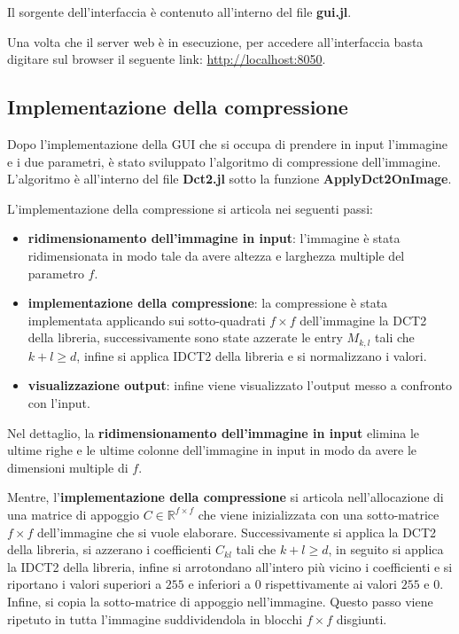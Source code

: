 Il sorgente dell'interfaccia è contenuto all'interno del file \textbf{gui.jl}.

Una volta che il server web è in esecuzione, per accedere all'interfaccia basta
digitare sul browser il seguente link: \href{http://localhost:8050}{http://localhost:8050}.

\subsection{Implementazione della compressione}
Dopo l'implementazione della GUI che si occupa di prendere in input l'immagine e
i due parametri, è stato sviluppato l'algoritmo di compressione dell'immagine.
L'algoritmo è all'interno del file \textbf{Dct2.jl} sotto la funzione \textbf{ApplyDct2OnImage}.

L'implementazione della compressione si articola nei seguenti passi:
\begin{itemize}
    \item \textbf{ridimensionamento dell'immagine in input}: l'immagine è stata
          ridimensionata in modo tale da avere altezza e larghezza multiple del
          parametro $f$.
    \item \textbf{implementazione della compressione}: la compressione è stata
          implementata applicando sui sotto-quadrati $f\times f$ dell'immagine
          la DCT2 della libreria, successivamente sono state azzerate le entry
          $M_{k,l}$ tali che $k+l\ge d$, infine si applica IDCT2 della libreria e
          si normalizzano i valori.
    \item \textbf{visualizzazione output}: infine viene visualizzato l'output
          messo a confronto con l'input.
\end{itemize}

Nel dettaglio, la \textbf{ridimensionamento dell'immagine in input} elimina le ultime
righe e le ultime colonne dell'immagine in input in modo da avere le dimensioni
multiple di $f$.

Mentre, l'\textbf{implementazione della compressione} si articola nell'allocazione
di una matrice di appoggio $C\in \mathbb{R}^{f\times f}$ che viene inizializzata
con una sotto-matrice $f\times f$ dell'immagine che si vuole elaborare. Successivamente
si applica la DCT2 della libreria, si azzerano i coefficienti $C_{kl}$ tali che
$k+l\ge d$, in seguito si applica la IDCT2 della libreria, infine si arrotondano
all'intero più vicino i coefficienti e si riportano i valori superiori a $255$
e inferiori a $0$ rispettivamente ai valori $255$ e $0$. Infine, si copia la
sotto-matrice di appoggio nell'immagine. Questo passo viene ripetuto in tutta
l'immagine suddividendola in blocchi $f \times f$ disgiunti.

